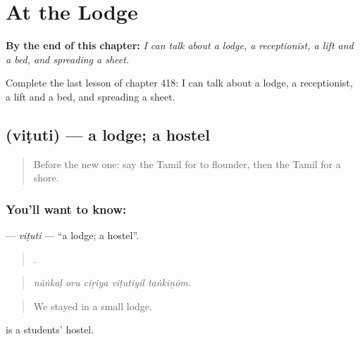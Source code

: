
\chapter{At the Lodge}
\label{ch:ta-at-the-lodge}

\begin{chapteropening}
\textbf{By the end of this chapter:} \emph{I can talk about a lodge, a receptionist, a lift and a bed, and spreading a sheet.}

Complete the last lesson of chapter 418: I can talk about a lodge, a receptionist, a lift and a bed, and spreading a sheet.
\end{chapteropening}

\section[\texorpdfstring{\ta{விடுதி} (viṭuti)}{விடுதி (viṭuti)}]{ (viṭuti) — a lodge; a hostel}

\label{lesson:TA-C418-vituti}



\begin{quote}
Before the new one: say the Tamil for to flounder, then the Tamil for a shore.
\end{quote}

\subsection*{You'll want to know: }
\textbf{} — \emph{viṭuti} — \textquotedblleft{}a lodge; a hostel\textquotedblright{}.

\begin{quote}
    .
\end{quote}

\begin{quote}
\emph{nāṅkaḷ oru ciṟiya viṭutiyil taṅkiṉōm.}
\end{quote}

\begin{quote}
We stayed in a small lodge.
\end{quote}

  is a students' hostel.

